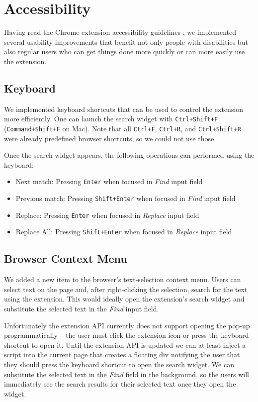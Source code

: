 \documentclass[bsc,frontabs,twoside,singlespacing,parskip,deptreport]{infthesis}
\providecommand{\tightlist}{%
  \setlength{\itemsep}{0pt}\setlength{\parskip}{0pt}}
\begin{document}
\section{Accessibility}
Having read the Chrome extension accessibility guidelines \cite{C4}, we implemented several usability improvements that benefit not only people with disabilities but also regular users who can get things done more quickly or can more easily use the extension. 

\subsection{Keyboard}
We implemented keyboard shortcuts that can be used to control the extension more efficiently. One can launch the search widget with \texttt{Ctrl+Shift+F} (\texttt{Command+Shift+F} on
Mac). Note that all \texttt{Ctrl+F}, \texttt{Ctrl+R}, and
\texttt{Ctrl+Shift+R} were already predefined browser shortcuts, so we could not use those.

Once the search widget appears, the following operations can performed using the keyboard:
\begin{itemize}
\tightlist
\item
  Next match: Pressing \texttt{Enter} when focused in \emph{Find} input field
\item
  Previous match: Pressing \texttt{Shift+Enter} when focused in \emph{Find} input field
\item
  Replace: Pressing \texttt{Enter} when focused in \emph{Replace} input field
\item
  Replace All: Pressing \texttt{Shift+Enter} when focused in \emph{Replace} input field
\end{itemize}

\subsection{Browser Context Menu}
We added a new item to the browser's text-selection context menu. Users can select text on the page and, after right-clicking the selection, search for the text using the extension. This would ideally open the extension's search widget and substitute the selected text in the \textit{Find} input field. 

Unfortunately the extension API currently does not support opening the pop-up programmatically \cite{A19} -- the user must click the extension icon or press the keyboard shortcut to open it. Until the extension API is updated we can at least inject a script into the current page that creates a floating div notifying the user that they should press the keyboard shortcut to open the search widget. We can substitute the selected text in the \textit{Find} field in the background, so the users will immediately see the search results for their selected text once they open the widget.
\end{document}

